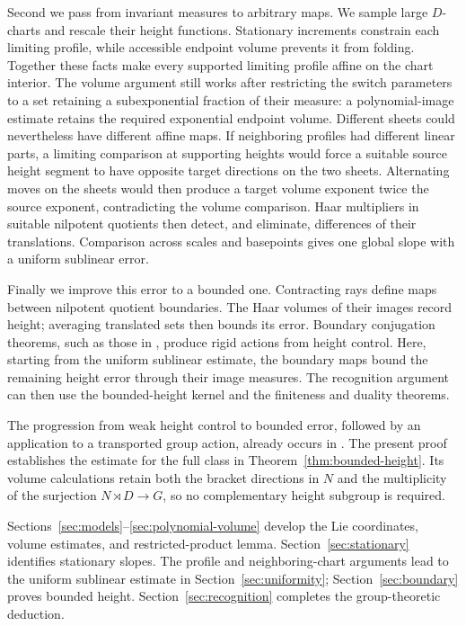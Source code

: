 Second we pass from invariant measures to arbitrary maps. We sample
large $D$-charts and rescale their height functions. Stationary
increments constrain each limiting profile, while accessible endpoint
volume prevents it from folding. Together these facts make every
supported limiting profile affine on the chart interior. The volume
argument still works after restricting the switch parameters to a set
retaining a subexponential fraction of their measure: a polynomial-image estimate retains the
required exponential endpoint volume.
Different sheets could nevertheless have different affine maps.
If neighboring profiles had different linear parts, a limiting
comparison at supporting heights would force a suitable source height
segment to have opposite target directions on the two sheets.
Alternating moves on the sheets would then produce a target volume
exponent twice the source exponent, contradicting the volume comparison.
Haar multipliers in suitable nilpotent
quotients then detect, and eliminate, differences of their translations.
Comparison across scales and basepoints gives one global slope with
a uniform sublinear error.

Finally we improve this error to a bounded one. Contracting rays define
maps between nilpotent quotient boundaries. The Haar volumes of their
images record height; averaging translated sets then bounds its error.
Boundary conjugation theorems, such as those in
\cite{Dymarz2010,DymarzFisherXie2025}, produce rigid actions from height
control. Here, starting from the uniform sublinear estimate, the
boundary maps bound the remaining height error through their image
measures. The recognition argument can then use
the bounded-height kernel and the finiteness and duality theorems.

The progression from weak height control to bounded error, followed by
an application to a transported group action, already occurs in
\cite[Sections~6.1--6.2 and Theorem~7.3]{EskinFisherWhyte2012}.
The present proof establishes the estimate for the full class in
Theorem~\ref{thm:bounded-height}. Its volume calculations retain both
the bracket directions in $N$ and the multiplicity of the surjection
$N\rtimes D\to G$, so no complementary height subgroup is required.

Sections~\ref{sec:models}--\ref{sec:polynomial-volume} develop the Lie
coordinates, volume estimates, and restricted-product lemma.
Section~\ref{sec:stationary} identifies stationary slopes. The profile
and neighboring-chart arguments lead to the uniform sublinear estimate
in Section~\ref{sec:uniformity}; Section~\ref{sec:boundary} proves bounded
height. Section~\ref{sec:recognition} completes the group-theoretic
deduction.
